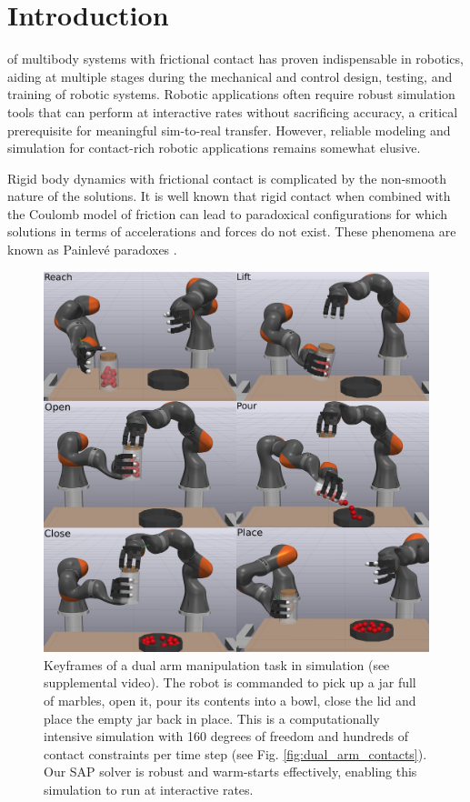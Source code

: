 \section{Introduction}
\label{sec:introduction}

 of multibody systems with frictional contact has
proven indispensable in robotics, aiding at multiple stages during the
mechanical and control design, testing, and training of robotic systems. Robotic
applications often require robust simulation tools that can perform at
interactive rates without sacrificing accuracy, a critical prerequisite for
meaningful sim-to-real transfer. However, reliable modeling and simulation for
contact-rich robotic applications remains somewhat elusive.

Rigid body dynamics with frictional contact is complicated by the non-smooth
nature of the solutions. It is well known \cite{bib:baraff1993issues} that rigid
contact when combined with the Coulomb model of friction can lead to paradoxical
configurations for which solutions in terms of accelerations and forces do not
exist. These phenomena are known as Painlev\'e paradoxes
\cite{bib:hogan2017regularization}.
%
\begin{figure}[!ht]
	\centering
    \includegraphics[width=0.95\columnwidth]{figures/dual_arm/tiled.png}
	\caption{\label{fig:dual_arm_frames}
    Keyframes of a dual arm manipulation task in simulation (see supplemental
    video). The robot is commanded to pick up a jar full of marbles, open it,
    pour its contents into a bowl, close the lid and place the empty jar back in
    place. This is a computationally intensive simulation with 160 degrees of
    freedom and hundreds of contact constraints per time step (see Fig.
    \ref{fig:dual_arm_contacts}). Our SAP solver is robust and warm-starts
    effectively, enabling this simulation to run at interactive rates.}
\end{figure}
